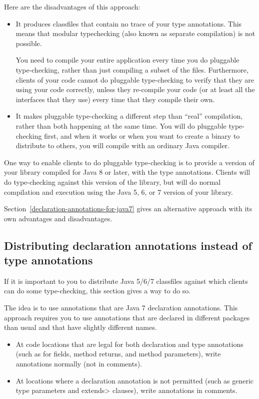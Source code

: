 Here are the disadvantages of this approach:

\begin{itemize}
\item
It produces classfiles that contain no trace of your type annotations.
This means that modular typechecking (also known as separate compilation)
is not possible.

You need to compile your entire application every time you
do pluggable type-checking, rather than just compiling a subset of the
files.  Furthermore, clients of your code cannot do pluggable
type-checking to verify that they are using your code correctly, unless
they re-compile your code (or at least all the interfaces that they use)
every time that they compile their own.

\item
It makes pluggable type-checking a
different step than ``real'' compilation, rather than both happening at the
same time.  You will do pluggable type-checking first, and when it works or
when you want to create a binary to distribute to others, you will compile
with an ordinary Java compiler.
\end{itemize}

One way to enable clients to do pluggable type-checking is to provide a
version of your library compiled for Java 8 or later, with the type
annotations.  Clients will do type-checking against this version of the
library, but will do normal compilation and execution using the Java 5, 6,
or 7 version of your library.

Section~\ref{declaration-annotations-for-java7} gives an alternative
approach with its own advantages and disadvantages.


\subsection{Distributing declaration annotations instead of type annotations\label{declaration-annotations-for-java7}}

If it is important to you to distribute Java 5/6/7 classfiles against which
clients can do some type-checking, this section gives a way to do so.

The idea is to 
use annotations that are Java 7 declaration annotations.
This approach requires you to use annotations that are declared in
different packages than usual and that have slightly different names.

\begin{itemize}
\item
At code locations that are legal for both declaration and type
annotations (such as for fields, method returns, and method parameters),
write annotations normally (not in comments).
\item
At locations where a declaration annotation is not permitted
(such as generic type parameters and \<extends> clauses), write
annotations in comments.
\end{itemize}

